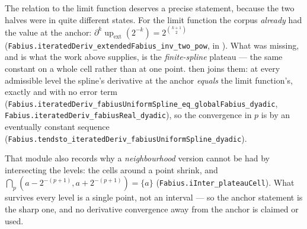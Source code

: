 \documentclass[11pt,oneside]{article}
\numberwithin{equation}{section}
\theoremstyle{definition}
\theoremstyle{remark}
\newcommand{\Up}{\operatorname{up}}
\begin{document}
\begin{obligation}
The relation to the limit function deserves a precise statement, because the two halves
were in quite different states.  For the limit function the corpus \emph{already} had the
value at the anchor: \(\partial^{k}\Up_{\mathrm{ext}}(2^{-k})=2^{\binom{k+1}{2}}\)
(\nolinkurl{Fabius.iteratedDeriv_extendedFabius_inv_two_pow}, in ).
What was missing, and is what the work above supplies, is the \emph{finite-spline} plateau ---
the same constant on a whole cell rather than at one point.   then
joins them: at every admissible level the spline's derivative at the anchor \emph{equals}
the limit function's, exactly and with no error term
(\nolinkurl{Fabius.iteratedDeriv_fabiusUniformSpline_eq_globalFabius_dyadic},
\nolinkurl{Fabius.iteratedDeriv_fabiusReal_dyadic}), so the convergence in \(p\) is by an
eventually constant sequence
(\nolinkurl{Fabius.tendsto_iteratedDeriv_fabiusUniformSpline_dyadic}).

That module also records why a \emph{neighbourhood} version cannot be had by intersecting
the levels: the cells around a point shrink, and
\(\bigcap_p\left(a-2^{-(p+1)},a+2^{-(p+1)}\right)=\{a\}\)
(\nolinkurl{Fabius.iInter_plateauCell}).  What survives every level is a single point, not
an interval --- so the anchor statement is the sharp one, and no derivative convergence away
from the anchor is claimed or used.
\end{obligation}
\end{document}
